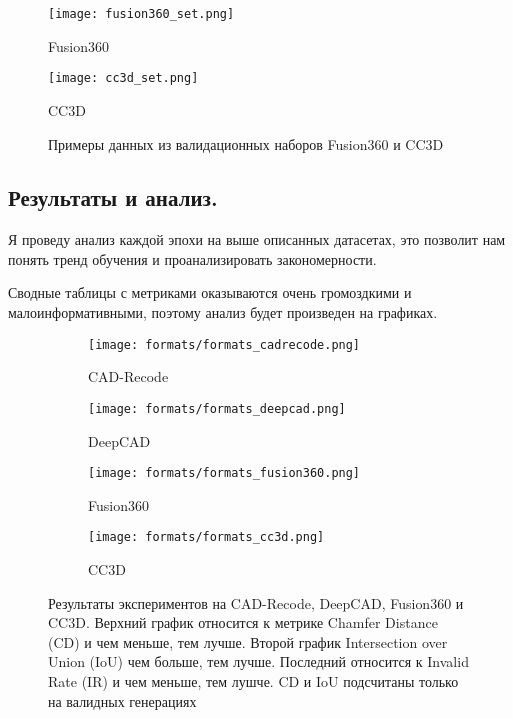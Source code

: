 \newpage

\begin{figure}[h!]
    \centering
    \texttt{[image: fusion360\_set.png]}
    \caption{Fusion360}

    \vspace{1em}

    \texttt{[image: cc3d\_set.png]}
    \caption{CC3D}

    \caption{Примеры данных из валидационных наборов Fusion360 и CC3D}
    \label{fig:datasets2}
\end{figure}

\newpage

\subsection{Результаты и анализ.}

Я проведу анализ каждой эпохи на выше описанных датасетах, это позволит нам понять тренд обучения и проанализировать закономерности.

Сводные таблицы с метриками оказываются очень громоздкими и малоинформативными, поэтому анализ будет произведен на графиках.

\begin{figure}[h!]
    \centering
    \begin{subfigure}{0.45\linewidth}
        \centering
        \texttt{[image: formats/formats\_cadrecode.png]}
        \caption{CAD-Recode}
    \end{subfigure}
    \hfill
    \begin{subfigure}{0.45\linewidth}
        \centering
        \texttt{[image: formats/formats\_deepcad.png]}
        \caption{DeepCAD}
    \end{subfigure}

    \vspace{1em}

    \begin{subfigure}{0.45\linewidth}
        \centering
        \texttt{[image: formats/formats\_fusion360.png]}
        \caption{Fusion360}
    \end{subfigure}
    \hfill
    \begin{subfigure}{0.45\linewidth}
        \centering
        \texttt{[image: formats/formats\_cc3d.png]}
        \caption{CC3D}
    \end{subfigure}

    \caption{Результаты экспериментов на CAD-Recode, DeepCAD, Fusion360 и CC3D.
        Верхний график относится к метрике Chamfer Distance (CD) и чем меньше, тем лучше. Второй график Intersection over Union (IoU) чем больше, тем лучше.
        Последний относится к Invalid Rate (IR) и чем меньше, тем лушче. CD и IoU подсчитаны только на валидных генерациях}
    \label{fig:exp1}
\end{figure}

